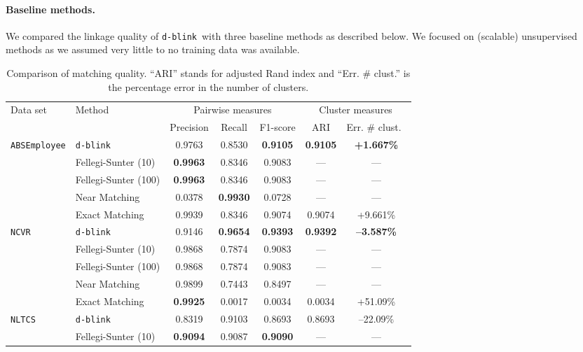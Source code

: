 \documentclass[12pt,letterpaper]{article}
\newcommand{\1}[1]{\mathbb{I}\!\left[#1\right]} %
\newcommand{\dblink}{\texttt{\upshape \lowercase{d-blink}}} %
\def\spacingset#1{\renewcommand{\baselinestretch}%
  {#1}\small\normalsize} \spacingset{1}
\begin{document}
\paragraph{Baseline methods.}
We compared the linkage quality of \dblink\ with three baseline methods as 
described below.
We focused on (scalable) unsupervised methods as we assumed very little to 
no training data was available.
\begin{table}[t]
	\centering
	\caption{Comparison of matching quality.
		``ARI'' stands for adjusted Rand index and ``Err. \# clust.'' 
		is the percentage error in the number of clusters.}
	\label{tbl:linkage-quality}
	\spacingset{1}
  \footnotesize
  \begin{center}
	\begin{tabular}{l l *{5}{c}}
		\toprule
		Data set    & Method & \multicolumn{3}{c}{Pairwise measures} & \multicolumn{2}{c}{Cluster measures} \\
		\cmidrule(lr){3-5} \cmidrule(lr){6-7}
		& & Precision & Recall & F1-score & ARI & Err. \# clust.\ \\
		\midrule
		\multirow{5}{*}{\texttt{ABSEmployee}} 
		& \dblink\              & 0.9763 & 0.8530 & \textbf{0.9105} & \textbf{0.9105} & \textbf{+1.667\%} \\
		& Fellegi-Sunter (10)   & \textbf{0.9963} & 0.8346 & 0.9083 & --- & --- \\
		& Fellegi-Sunter (100)  & \textbf{0.9963} & 0.8346 & 0.9083 & --- & --- \\
		& Near Matching         & 0.0378 & \textbf{0.9930} & 0.0728 & --- & --- \\
		& Exact Matching        & 0.9939 & 0.8346 & 0.9074 & 0.9074 & +9.661\% \\
		\midrule
		\multirow{5}{*}{\texttt{NCVR}}
		& \dblink\              & 0.9146 & \textbf{0.9654} & \textbf{0.9393} & \textbf{0.9392} & \textbf{--3.587\%}\\
		& Fellegi-Sunter (10)   & 0.9868 & 0.7874 & 0.9083  & --- & ---\\
		& Fellegi-Sunter (100)  & 0.9868 & 0.7874 & 0.9083 & --- & --- \\
		& Near Matching         & 0.9899 & 0.7443 & 0.8497 & --- & --- \\
		& Exact Matching        & \textbf{0.9925} & 0.0017 & 0.0034 & 0.0034 & +51.09\% \\
		\midrule
		\multirow{5}{*}{\texttt{NLTCS}}
		& \dblink\              & 0.8319 & 0.9103 & 0.8693 & 0.8693 & --22.09\% \\
		& Fellegi-Sunter (10)   & \textbf{0.9094} & 0.9087 & \textbf{0.9090} & --- & --- \\

\end{tabular}
\end{center}
\end{table}
\end{document}
